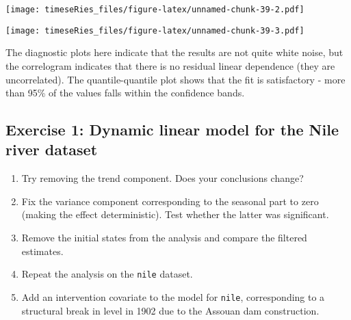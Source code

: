 \documentclass[]{book}
\newenvironment{Shaded}{\begin{snugshade}}{\end{snugshade}}
\newcommand{\KeywordTok}[1]{\textcolor[rgb]{0.13,0.29,0.53}{\textbf{#1}}}
\newcommand{\DataTypeTok}[1]{\textcolor[rgb]{0.13,0.29,0.53}{#1}}
\newcommand{\DecValTok}[1]{\textcolor[rgb]{0.00,0.00,0.81}{#1}}
\newcommand{\FloatTok}[1]{\textcolor[rgb]{0.00,0.00,0.81}{#1}}
\newcommand{\StringTok}[1]{\textcolor[rgb]{0.31,0.60,0.02}{#1}}
\newcommand{\CommentTok}[1]{\textcolor[rgb]{0.56,0.35,0.01}{\textit{#1}}}
\newcommand{\ControlFlowTok}[1]{\textcolor[rgb]{0.13,0.29,0.53}{\textbf{#1}}}
\newcommand{\OperatorTok}[1]{\textcolor[rgb]{0.81,0.36,0.00}{\textbf{#1}}}
\newcommand{\NormalTok}[1]{#1}
\providecommand{\tightlist}{%
  \setlength{\itemsep}{0pt}\setlength{\parskip}{0pt}}
\begin{document}
\texttt{[image: timeseRies\_files/figure-latex/unnamed-chunk-39-2.pdf]}

\begin{Shaded}
\end{Shaded}

\texttt{[image: timeseRies\_files/figure-latex/unnamed-chunk-39-3.pdf]}

The diagnostic plots here indicate that the results are not quite white
noise, but the correlogram indicates that there is no residual linear
dependence (they are uncorrelated). The quantile-quantile plot shows
that the fit is satisfactory - more than 95\% of the values falls within
the confidence bands.

\subsection{Exercise 1: Dynamic linear model for the Nile river
dataset}\label{exercise-1-dynamic-linear-model-for-the-nile-river-dataset}

\begin{enumerate}
\def\labelenumi{\arabic{enumi}.}
\tightlist
\item
  Try removing the trend component. Does your conclusions change?
\item
  Fix the variance component corresponding to the seasonal part to zero
  (making the effect deterministic). Test whether the latter was
  significant.
\item
  Remove the initial states from the analysis and compare the filtered
  estimates.
\item
  Repeat the analysis on the \texttt{nile} dataset.
\item
  Add an intervention covariate to the model for \texttt{nile},
  corresponding to a structural break in level in 1902 due to the
  Assouan dam construction.
\end{enumerate}
\end{document}
